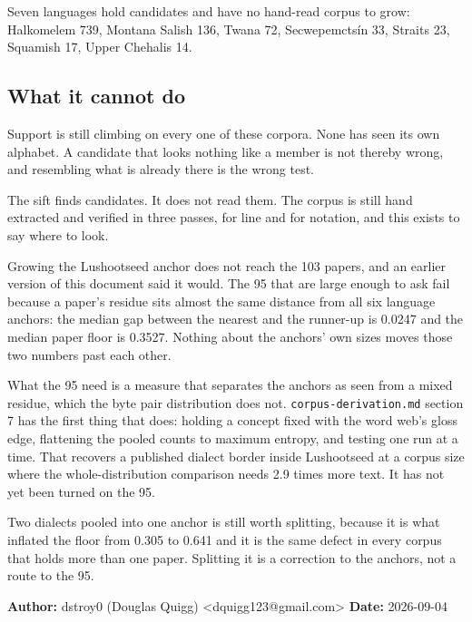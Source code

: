 Seven languages hold candidates and have no hand-read corpus to grow: Halkomelem 739, Montana Salish 136, Twana 72, Secwepemctsín 33, Straits 23, Squamish 17, Upper Chehalis 14.

\subsection{What it cannot do}

Support is still climbing on every one of these corpora. None has seen its own alphabet. A candidate that looks nothing like a member is not thereby wrong, and resembling what is already there is the wrong test.

The sift finds candidates. It does not read them. The corpus is still hand extracted and verified in three passes, for line and for notation, and this exists to say where to look.

Growing the Lushootseed anchor does not reach the 103 papers, and an earlier version of this document said it would. The 95 that are large enough to ask fail because a paper's residue sits almost the same distance from all six language anchors: the median gap between the nearest and the runner-up is 0.0247 and the median paper floor is 0.3527. Nothing about the anchors' own sizes moves those two numbers past each other.

What the 95 need is a measure that separates the anchors as seen from a mixed residue, which the byte pair distribution does not. \texttt{corpus-\allowbreak{}derivation.\allowbreak{}md} section 7 has the first thing that does: holding a concept fixed with the word web's gloss edge, flattening the pooled counts to maximum entropy, and testing one run at a time. That recovers a published dialect border inside Lushootseed at a corpus size where the whole-distribution comparison needs 2.9 times more text. It has not yet been turned on the 95.

Two dialects pooled into one anchor is still worth splitting, because it is what inflated the floor from 0.305 to 0.641 and it is the same defect in every corpus that holds more than one paper. Splitting it is a correction to the anchors, not a route to the 95.

\textbf{Author:} dstroy0 (Douglas Quigg) <dquigg123@gmail.com> \textbf{Date:} 2026-09-04

